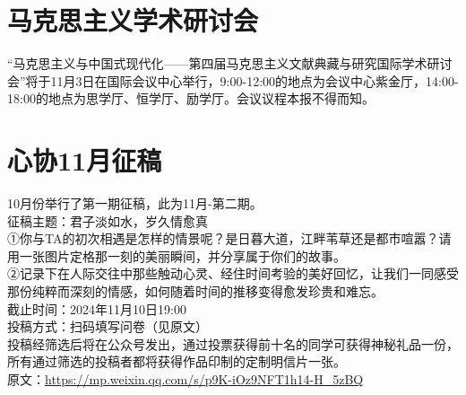 \documentclass[letterpaper, 12pt]{article}
\begin{document}
\begin{multicols}{2}
\section{马克思主义学术研讨会}
“马克思主义与中国式现代化——第四届马克思主义文献典藏与研究国际学术研讨会”将于11月3日在国际会议中心举行，9:00-12:00的地点为会议中心紫金厅，14:00-18:00的地点为思学厅、恒学厅、励学厅。会议议程本报不得而知。
\section{心协11月征稿}
10月份举行了第一期征稿，此为11月-第二期。\\
征稿主题：君子淡如水，岁久情愈真\\
①你与TA的初次相遇是怎样的情景呢？是日暮大道，江畔苇草还是都市喧嚣？请用一张图片定格那一刻的美丽瞬间，并分享属于你们的故事。\\
②记录下在人际交往中那些触动心灵、经住时间考验的美好回忆，让我们一同感受那份纯粹而深刻的情感，如何随着时间的推移变得愈发珍贵和难忘。\\
截止时间：2024年11月10日19:00\\
投稿方式：扫码填写问卷（见原文）\\
投稿经筛选后将在公众号发出，通过投票获得前十名的同学可获得神秘礼品一份，所有通过筛选的投稿者都将获得作品印制的定制明信片一张。\\
原文：\url{https://mp.weixin.qq.com/s/p9K-iOz9NFT1h14-H_5zBQ}


\end{multicols} 
\end{document}
